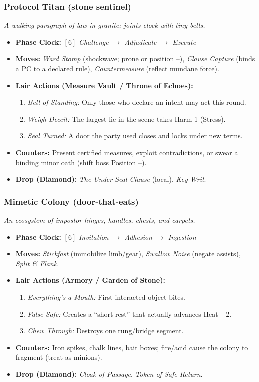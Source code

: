 \subsubsection*{Protocol Titan (stone sentinel)}
\textit{A walking paragraph of law in granite; joints clock with tiny bells.}
\begin{itemize}
  \item \textbf{Phase Clock:} \([6]\) \emph{Challenge \(\rightarrow\) Adjudicate \(\rightarrow\) Execute}
  \item \textbf{Moves:} \emph{Ward Stomp} (shockwave; prone or position --), \emph{Clause Capture} (binds a PC to a declared rule), \emph{Countermeasure} (reflect mundane force).
  \item \textbf{Lair Actions (Measure Vault / Throne of Echoes):}
  \begin{enumerate}\item \emph{Bell of Standing:} Only those who declare an intent may act this round.\item \emph{Weigh Deceit:} The largest lie in the scene takes Harm 1 (Stress).\item \emph{Seal Turned:} A door the party used closes and locks under new terms. \end{enumerate}
  \item \textbf{Counters:} Present certified measures, exploit contradictions, or swear a binding minor oath (shift boss Position --).
  \item \textbf{Drop (Diamond):} \emph{The Under-Seal Clause} (local), \emph{Key-Writ}.
\end{itemize}

\subsubsection*{Mimetic Colony (door-that-eats)}
\textit{An ecosystem of impostor hinges, handles, chests, and carpets.}
\begin{itemize}
  \item \textbf{Phase Clock:} \([6]\) \emph{Invitation \(\rightarrow\) Adhesion \(\rightarrow\) Ingestion}
  \item \textbf{Moves:} \emph{Stickfast} (immobilize limb/gear), \emph{Swallow Noise} (negate assists), \emph{Split \& Flank}.
  \item \textbf{Lair Actions (Armory / Garden of Stone):}
  \begin{enumerate}\item \emph{Everything’s a Mouth:} First interacted object bites.\item \emph{False Safe:} Creates a “short rest” that actually advances Heat +2.\item \emph{Chew Through:} Destroys one rung/bridge segment. \end{enumerate}
  \item \textbf{Counters:} Iron spikes, chalk lines, bait boxes; fire/acid cause the colony to fragment (treat as minions).
  \item \textbf{Drop (Diamond):} \emph{Cloak of Passage}, \emph{Token of Safe Return}.
\end{itemize}


